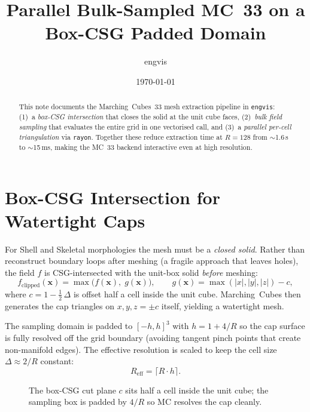 \documentclass[11pt]{article}
\title{Parallel Bulk-Sampled MC~33 on a\\ Box-CSG Padded Domain}
\author{engvis}
\date{\today}
\begin{document}
\maketitle

\begin{abstract}
This note documents the Marching~Cubes~33 mesh extraction pipeline in
\texttt{engvis}: (1)~a \emph{box-CSG intersection} that closes the
solid at the unit cube faces, (2)~\emph{bulk field sampling} that
evaluates the entire grid in one vectorised call, and (3)~a
\emph{parallel per-cell triangulation} via \texttt{rayon}.  Together
these reduce extraction time at $R{=}128$ from $\sim$1.6\,s to
$\sim$15\,ms, making the MC~33 backend interactive even at high
resolution.
\end{abstract}

\section{Box-CSG Intersection for Watertight Caps}

For Shell and Skeletal morphologies the mesh must be a \emph{closed
solid}.  Rather than reconstruct boundary loops after meshing (a
fragile approach that leaves holes), the field $f$ is
CSG-intersected with the unit-box solid \emph{before} meshing:
\begin{equation}
  f_{\text{clipped}}(\mathbf{x}) = \max\!\bigl(f(\mathbf{x}),\;
  g(\mathbf{x})\bigr),\qquad
  g(\mathbf{x}) = \max(|x|,|y|,|z|) - c,
\end{equation}
where $c = 1 - \tfrac{1}{2}\,\Delta$ is offset half a cell inside
the unit cube.  Marching~Cubes then generates the cap triangles on
$x,y,z = \pm c$ itself, yielding a watertight mesh.

The sampling domain is padded to $[-h,h]^3$ with
$h = 1 + 4/R$ so the cap surface is fully resolved off the grid
boundary (avoiding tangent pinch points that create non-manifold
edges).  The effective resolution is scaled to keep the cell size
$\Delta \approx 2/R$ constant:
\begin{equation}
  R_{\text{eff}} = \lceil R \cdot h \rceil.
\end{equation}

\begin{figure}[h]
\centering
{}
\caption{The box-CSG cut plane $c$ sits half a cell inside the unit
cube; the sampling box is padded by $4/R$ so MC resolves the cap
cleanly.}
\label{fig:boxcsg}
\end{figure}
\end{document}
